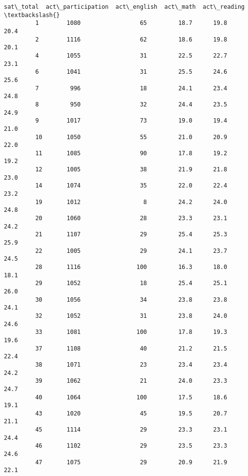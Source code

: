 \documentclass[11pt]{article}
\begin{document}
\begin{Verbatim}[commandchars=\\\{\}]
             sat\_total  act\_participation  act\_english  act\_math  act\_reading  \textbackslash{}
         1        1080                 65         18.7      19.8         20.4   
         2        1116                 62         18.6      19.8         20.1   
         4        1055                 31         22.5      22.7         23.1   
         6        1041                 31         25.5      24.6         25.6   
         7         996                 18         24.1      23.4         24.8   
         8         950                 32         24.4      23.5         24.9   
         9        1017                 73         19.0      19.4         21.0   
         10       1050                 55         21.0      20.9         22.0   
         11       1085                 90         17.8      19.2         19.2   
         12       1005                 38         21.9      21.8         23.0   
         14       1074                 35         22.0      22.4         23.2   
         19       1012                  8         24.2      24.0         24.8   
         20       1060                 28         23.3      23.1         24.2   
         21       1107                 29         25.4      25.3         25.9   
         22       1005                 29         24.1      23.7         24.5   
         28       1116                100         16.3      18.0         18.1   
         29       1052                 18         25.4      25.1         26.0   
         30       1056                 34         23.8      23.8         24.1   
         32       1052                 31         23.8      24.0         24.6   
         33       1081                100         17.8      19.3         19.6   
         37       1108                 40         21.2      21.5         22.4   
         38       1071                 23         23.4      23.4         24.2   
         39       1062                 21         24.0      23.3         24.7   
         40       1064                100         17.5      18.6         19.1   
         43       1020                 45         19.5      20.7         21.1   
         45       1114                 29         23.3      23.1         24.4   
         46       1102                 29         23.5      23.3         24.6   
         47       1075                 29         20.9      21.9         22.1   
         

\end{Verbatim}
\end{document}
